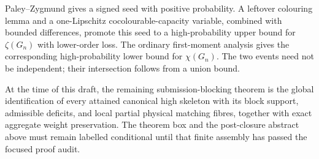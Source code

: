 Paley--Zygmund gives a signed seed with positive probability.  A leftover
colouring lemma and a one-Lipschitz cocolourable-capacity variable, combined
with bounded differences, promote this seed to a high-probability upper bound
for $\zeta(G_n)$ with lower-order loss.  The ordinary first-moment analysis gives
the corresponding high-probability lower bound for $\chi(G_n)$.  The two events
need not be independent; their intersection follows from a union bound.

At the time of this draft, the remaining submission-blocking theorem is the
global identification of every attained canonical high skeleton with its block
support, admissible deficits, and local partial physical matching fibres,
together with exact aggregate weight preservation.  The theorem box and the
post-closure abstract above must remain labelled conditional until that finite
assembly has passed the focused proof audit.
